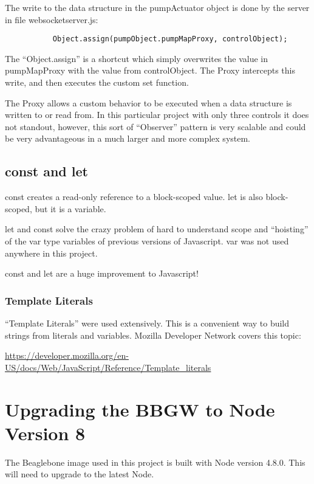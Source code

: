 The write to the data structure in the pumpActuator object is done by the 
server in file websocketserver.js:

\begin{verbatim}
           Object.assign(pumpObject.pumpMapProxy, controlObject);
\end{verbatim}

The ``Object.assign'' is a shortcut which simply overwrites the value in 
pumpMapProxy with the value from controlObject.  The Proxy intercepts this 
write, and then executes the custom set function.

The Proxy allows a custom behavior to be executed when a data structure is 
written to or read from.  In this particular project 
with only three controls it does not standout, however, this sort of 
``Observer'' pattern is very scalable and could be very advantageous in a much 
larger and more complex system.

\subsection{const and let}

const creates a read-only reference to a block-scoped value.
let is also block-scoped, but it is a variable.

let and const solve the crazy problem of hard to understand scope and 
``hoisting'' of the var type variables of previous versions of Javascript.
 var was not used anywhere in this project.
 
 const and let are a huge improvement to Javascript!
 
 \subsubsection{Template Literals}
 
 ``Template Literals'' were used extensively.  This is a convenient way to 
 build strings from literals and variables.  Mozilla Developer Network covers 
 this topic:
 
 \url{https://developer.mozilla.org/en-US/docs/Web/JavaScript/Reference/Template_literals}
 
 \section{Upgrading the BBGW to Node Version 8}
 
 The Beaglebone image used in this project is built with Node version 4.8.0.  
 This will need to upgrade to the latest Node.
 
